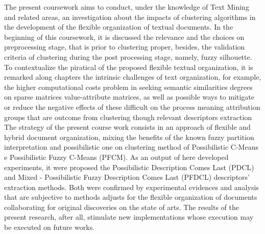 The present coursework aims to conduct, under the knowledge of Text Mining and related areas, an
investigation about the impacts of clustering algorithms in the development of the flexible
organization of textual documents. In the beginning of this coursework, it is discussed the
relevance and the choices on  preprocessing stage, that is prior to clustering proper, besides, the
validation criteria of clustering during the post processing stage, namely, fuzzy silhouette. To
contextualize the piratical of the proposed flexible textual organization, it is remarked along
chapters the intrinsic challenges of text organization, for example, the  higher computational costs
problem in seeking semantic similarities degrees on sparse matrices value-attribute matrices, as
well as possible ways to mitigate or reduce the negative effects of these difficult on the process
meaning attribution groups that are outcome from clustering though relevant descriptors extraction
The strategy of the present course work consists in an approach of flexible and hybrid document
organization, mixing the benefits of the known fuzzy partition interpretation and possibilistic one
on clustering method of Possibilistic C-Means e Possibilistic Fuzzy C-Means (PFCM). As an output of
here developed experiments, it were proposed the Possibilistic Description Comes Last (PDCL) and
Mixed - Possibilistic Fuzzy Description Comes Last (PFDCL) descriptors' extraction methods.
Both were confirmed by experimental evidences and analysis that are subjective to methods adjusts
for the flexible organization of documents collaborating for original discoveries on the state of
arts. The results of the present research, after all, stimulate new implementations whose execution
may be executed on future works.
